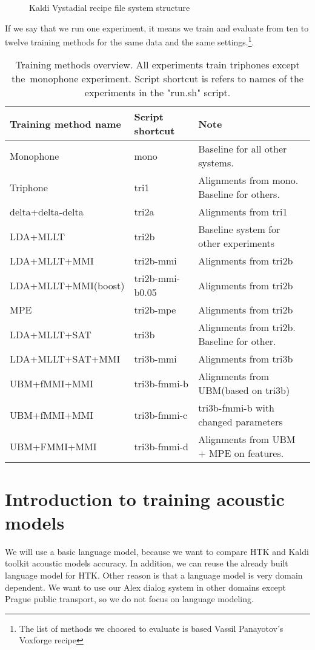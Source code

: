 \begin{figure}[!htp]
\centering \theverbbox \caption{\small{Kaldi Vystadial recipe file system structure}}
\label{fig:ascii-box}
\end{figure}

If we say that we run one experiment, it means we train and evaluate from ten to twelve training methods 
for the same data and the same settings.\footnote{The list of methods we choosed to evaluate is based Vassil Panayotov's Voxforge recipe}.

\begin{table}[!htp]\label{tab:methods}
\small{\begin{tabular}{lll}
\hline
Training method name & Script shortcut & Note\\
\hline
Monophone & mono & Baseline for all other systems.\\
Triphone  & tri1 &  Alignments from mono. Baseline for others.\\
delta+delta-delta & tri2a & Alignments from tri1 \\
LDA+MLLT & tri2b &  Baseline system for other experiments \\
LDA+MLLT+MMI & tri2b-mmi & Alignments from tri2b \\
LDA+MLLT+MMI(boost) & tri2b-mmi-b0.05  & Alignments from tri2b \\
MPE & tri2b-mpe & Alignments from tri2b \\
LDA+MLLT+SAT & tri3b & Alignments from tri2b. Baseline for other. \\
LDA+MLLT+SAT+MMI & tri3b-mmi  & Alignments from tri3b \\
    UBM+fMMI+MMI & tri3b-fmmi-b & Alignments from UBM(based on tri3b) \\
UBM+fMMI+MMI & tri3b-fmmi-c & tri3b-fmmi-b with changed parameters \\
UBM+FMMI+MMI & tri3b-fmmi-d & Alignments from UBM + MPE on features.\\ 
\end{tabular}}\caption{Training methods overview. All experiments train triphones except the~monophone experiment. Script shortcut is refers to names of the experiments in the "run.sh" script.}\end{table}


\section{Introduction to training acoustic models} 
\label{sec:introduction_to_training_acoustic_models}
We will use a basic language model, because we want to compare \ac{HTK} and Kaldi 
toolkit acoustic models accuracy.  In addition, we can reuse the already built 
language model for \ac{HTK}. Other reason is that a language model is very domain 
dependent. %
We want to use our Alex dialog system in other domains except Prague public 
transport, so we do not focus on language modeling. 

